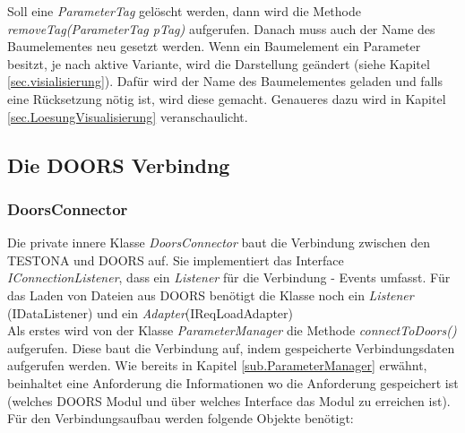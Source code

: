 Soll eine \textit{ParameterTag} gelöscht werden, dann wird die Methode \textit{removeTag(ParameterTag pTag)} aufgerufen. Danach muss auch der Name des Baumelementes neu gesetzt werden. Wenn ein Baumelement ein Parameter besitzt, je nach aktive Variante, wird die Darstellung geändert (siehe Kapitel \ref{sec.visialisierung}). Dafür wird der Name des Baumelementes geladen und falls eine Rücksetzung nötig ist, wird diese gemacht. Genaueres dazu wird in Kapitel \ref{sec.LoesungVisualisierung} veranschaulicht.\\

\subsection{Die DOORS Verbindng}\label{sub.DoorsConn}
\subsubsection{DoorsConnector}

Die private innere Klasse \textit{DoorsConnector} baut die Verbindung zwischen den TESTONA und DOORS auf. Sie implementiert das Interface \textit{IConnectionListener}, dass ein \textit{Listener} für die Verbindung - Events umfasst. Für das Laden von Dateien aus DOORS benötigt die Klasse noch ein \textit{Listener} (IDataListener) und ein \textit{Adapter}(IReqLoadAdapter) \\

Als erstes wird von der Klasse \textit{ParameterManager} die Methode \textit{connectToDoors()} aufgerufen. Diese baut die Verbindung auf, indem gespeicherte Verbindungsdaten aufgerufen werden. Wie bereits in Kapitel \ref{sub.ParameterManager} erwähnt, beinhaltet eine Anforderung die Informationen wo die Anforderung gespeichert ist (welches DOORS Modul und über welches Interface das Modul zu erreichen ist). Für den Verbindungsaufbau werden folgende Objekte benötigt:


